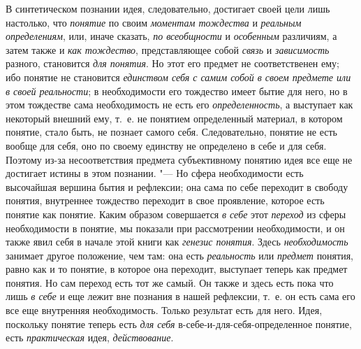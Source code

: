 {{В синтетическом познании идея, следовательно, достигает своей
цели лишь настолько, что {\em понятие}
по своим {\em моментам
тождества} и
{\em реальным определениям},
или, иначе сказать,
{\em по всеобщности} и
{\em особенным}
различиям, а затем также и
{\em как тождество},
представляющее собой
{\em связь} и
{\em зависимость}
разного, становится
{\em для понятия}. Но
этот его предмет не соответственен ему; ибо понятие не становится
{\em единством себя с самим собой в
своем предмете или в своей реальности}; в необходимости его
тождество имеет бытие для него, но в этом тождестве сама необходимость не
есть его {\em определенность},
а выступает как некоторый внешний ему, т.~е. не понятием
определенный материал, в котором понятие, стало быть, не познает самого
себя. Следовательно, понятие не есть вообще для себя, оно по своему
единству не определено в себе и для себя. Поэтому из-за несоответствия
предмета субъективному понятию идея все еще не достигает
истины в этом познании. "--- Но сфера необходимости есть
высочайшая вершина бытия и рефлексии; она сама по себе переходит в свободу
понятия, внутреннее тождество переходит в свое проявление, которое есть
понятие как понятие. Каким образом совершается
{\em в себе} этот
{\em переход} из сферы
необходимости в понятие, мы показали при рассмотрении необходимости, и он
также явил себя в начале этой книги как
{\em генезис понятия}.
Здесь {\em необходимость}
занимает другое положение, чем там: она есть
{\em реальность} или
{\em предмет} понятия,
равно как и то понятие, в которое она переходит, выступает теперь как
предмет понятия. Но сам переход есть тот же самый. Он также и здесь есть
пока что лишь {\em в себе}
и еще лежит вне познания в нашей рефлексии, т.~е. он есть
сама его все еще внутренняя необходимость. Только результат есть для него.
Идея, поскольку понятие теперь есть
{\em для себя}
в-себе-и-для-себя-определенное понятие, есть
{\em практическая} идея,
{\em действование}.

}}
